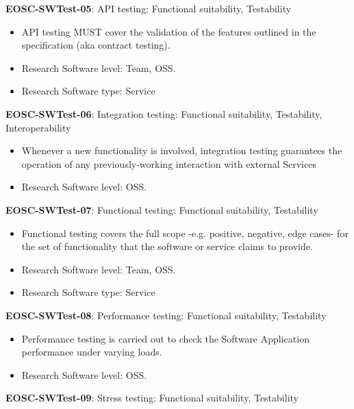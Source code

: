 \textbf{EOSC-SWTest-05}: API testing: Functional suitability, Testability

\begin{itemize}
    \item API testing MUST cover the validation of the features outlined in the specification (aka contract testing).~\cite{orviz_fernandez_eosc-synergy_2020}
    \item Research Software level: Team, OSS.
    \item Research Software type: Service
\end{itemize}

\textbf{EOSC-SWTest-06}: Integration testing: Functional suitability, Testability, Interoperability

\begin{itemize}
    \item Whenever a new functionality is involved, integration testing guarantees the operation of any previously-working interaction with external Services~\cite{iso_25010_2011_2017,orviz_fernandez_eosc-synergy_2020}
    \item Research Software level: OSS.
\end{itemize}

\textbf{EOSC-SWTest-07}: Functional testing: Functional suitability, Testability

\begin{itemize}
    \item Functional testing covers the full scope -e.g. positive, negative, edge cases- for the set of functionality that the software or service claims to provide.~\cite{iso_25010_2011_2017,orviz_fernandez_eosc-synergy_2020}
    \item Research Software level: Team, OSS.
    \item Research Software type: Service
\end{itemize}

\textbf{EOSC-SWTest-08}: Performance testing: Functional suitability, Testability

\begin{itemize}
    \item Performance testing is carried out to check the Software Application performance under varying loads.~\cite{iso_25010_2011_2017,orviz_fernandez_eosc-synergy_2020}
    \item Research Software level: OSS.
\end{itemize}

\textbf{EOSC-SWTest-09}: Stress testing: Functional suitability, Testability

